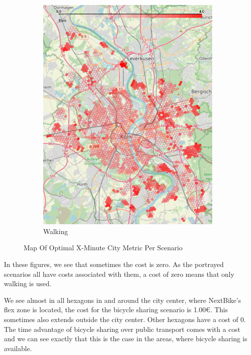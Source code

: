 \begin{figure}
\begin{subfigure}[b]{0.3\textwidth}
         \includegraphics[width=\textwidth]{Figures/results/cost/bicycle_public_transport_cost_map}
         \caption{Walking}
         \label{fig:bicycle_public_transport_cost_map}
     \end{subfigure}
        \caption{Map Of Optimal X-Minute City Metric Per Scenario}
        \label{fig:cost_map_per_scenario}
\end{figure}

In these figures, we see that sometimes the cost is zero.
As the portrayed scenarios all have costs associated with them, a cost of zero means that only walking is used.

We see almost in all hexagons in and around the city center, where NextBike's flex zone is located, the cost for the bicycle sharing scenario is 1.00€.
This sometimes also extends outside the city center.
Other hexagons have a cost of 0.
The time advantage of bicycle sharing over public transport comes with a cost and we can see exactly that this is the case in the areas, where bicycle sharing is available.

